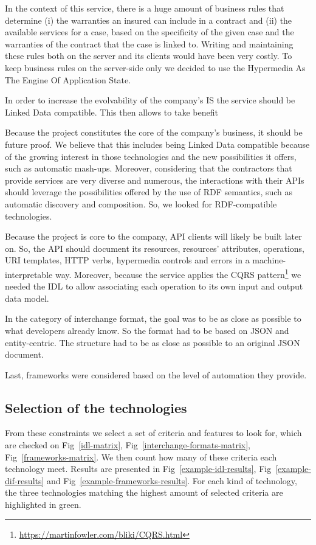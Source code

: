 In the context of this service, there is a huge amount of business rules that determine (i) the warranties an insured can include in a contract and (ii) the available services for a case, based on the specificity of the given case and the warranties of the contract that the case is linked to. Writing and maintaining these rules both on the server and its clients would have been very costly. To keep business rules on the server-side only we decided to use the Hypermedia As The Engine Of Application State.

In order to increase the evolvability of the company's IS the service should be Linked Data compatible. This then allows to take benefit 

Because the project constitutes the core of the company's business, it should be future proof. We believe that this includes being Linked Data compatible because of the growing interest in those technologies and the new possibilities it offers, such as automatic mash-ups. Moreover, considering that the contractors that provide services are very diverse and numerous, the interactions with their APIs should leverage the possibilities offered by the use of RDF semantics, such as automatic discovery and composition. So, we looked for RDF-compatible technologies.

Because the project is core to the company, API clients will likely be built later on. So, the API should document its resources, resources' attributes, operations, URI templates, HTTP verbs, hypermedia controls and errors in a machine-interpretable way. Moreover, because the service applies the CQRS pattern\footnote{\url{https://martinfowler.com/bliki/CQRS.html}} we needed the IDL to allow associating each operation to its own input and output data model.

In the category of interchange format, the goal was to be as close as possible to what developers already know. So the format had to be based on JSON and entity-centric. The structure had to be as close as possible to an original JSON document.

Last, frameworks were considered based on the level of automation they provide.

\subsection{Selection of the technologies}

From these constraints we select a set of criteria and features to look for, which are checked on Fig~\ref{idl-matrix}, Fig~\ref{interchange-formats-matrix}, Fig~\ref{frameworks-matrix}. We then count how many of these criteria each technology meet. Results are presented in Fig~\ref{example-idl-results}, Fig~\ref{example-dif-results} and Fig~\ref{example-frameworks-results}. For each kind of technology, the three technologies matching the highest amount of selected criteria are highlighted in green.

